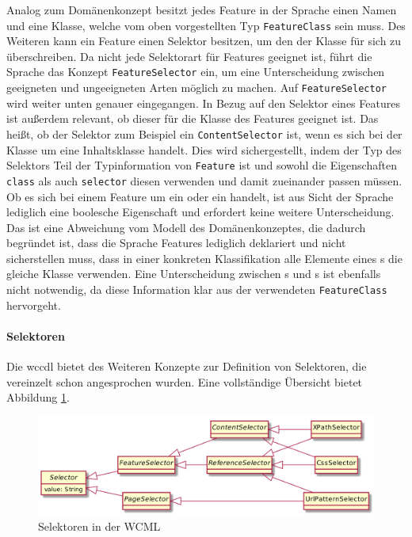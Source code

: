     Analog zum Domänenkonzept besitzt jedes Feature in der Sprache einen Namen
    und eine Klasse, welche vom oben vorgestellten Typ \texttt{FeatureClass} sein muss.
    Des Weiteren kann ein Feature einen Selektor besitzen,
    um den der Klasse für sich zu überschreiben.
    Da nicht jede Selektorart für Features geeignet ist,
    führt die Sprache das Konzept \texttt{FeatureSelector} ein,
    um eine Unterscheidung zwischen geeigneten und ungeeigneten Arten möglich zu machen.
    Auf \texttt{FeatureSelector} wird weiter unten genauer eingegangen.
    In Bezug auf den Selektor eines Features ist außerdem relevant,
    ob dieser für die Klasse des Features geeignet ist.
    Das heißt, ob der Selektor zum Beispiel ein \texttt{ContentSelector} ist,
    wenn es sich bei der Klasse um eine Inhaltsklasse handelt.
    Dies wird sichergestellt,
    indem der Typ des Selektors Teil der Typinformation von
    \texttt{Feature} ist und sowohl die Eigenschaften \texttt{class} als auch
    \texttt{selector} diesen verwenden und damit zueinander passen müssen.
    Ob es sich bei einem Feature um ein {\scalarFeature} oder ein {\collectionFeature} handelt,
    ist aus Sicht der Sprache lediglich eine boolesche Eigenschaft und erfordert
    keine weitere Unterscheidung.
    Das ist eine Abweichung vom Modell des Domänenkonzeptes, die dadurch begründet ist,
    dass die Sprache Features lediglich deklariert und nicht sicherstellen muss,
    dass in einer konkreten Klassifikation alle Elemente eines {\collectionFeature}s die gleiche Klasse verwenden.
    Eine Unterscheidung zwischen {\contentFeature}s und {}s
    ist ebenfalls nicht notwendig,
    da diese Information klar aus der verwendeten \texttt{FeatureClass} hervorgeht.

    \paragraph{Selektoren}
    Die \gls{wccdl} bietet des Weiteren Konzepte zur Definition von Selektoren,
    die vereinzelt schon angesprochen wurden.
    Eine vollständige Übersicht bietet Abbildung \ref{image:dslSelectors}.

    \begin{figure}[htb]
        \centering
        \includegraphics[scale=\imageScalingFactor]{../resources/dsl/selectors.png}
        \caption{Selektoren in der WCML}
        \label{image:dslSelectors}
    \end{figure}

